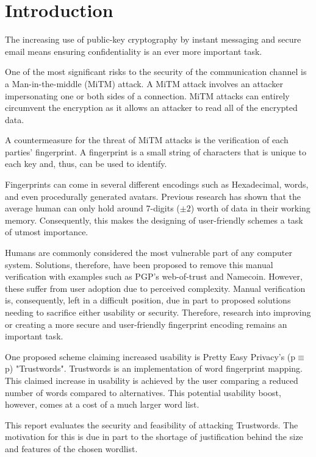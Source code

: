 \chapter{Introduction}
\label{cha:Introduction}

The increasing use of public-key cryptography by instant messaging and secure email means ensuring confidentiality is an ever more important task.

One of the most significant risks to the security of the communication channel is a Man-in-the-middle (MiTM) attack. A MiTM attack involves an attacker impersonating one or both sides of a connection. MiTM attacks can entirely circumvent the encryption as it allows an attacker to read all of the encrypted data. 

A countermeasure for the threat of MiTM attacks is the verification of each parties’ fingerprint. A fingerprint is a small string of characters that is unique to each key and, thus, can be used to identify.

Fingerprints can come in several different encodings such as Hexadecimal, words, and even procedurally generated avatars. Previous research has shown that the average human can only hold around 7-digits ($\pm 2$) worth of data in their working memory\cite{miller1956magical}. Consequently, this makes the designing of user-friendly schemes a task of utmost importance.

Humans are commonly considered the most vulnerable part of any computer system. Solutions, therefore, have been proposed to remove this manual verification with examples such as PGP's web-of-trust\cite{callas1998openpgp} and Namecoin\cite{kalodner2015empirical}. However, these suffer from user adoption due to perceived complexity. Manual verification is, consequently, left in a difficult position, due in part to proposed solutions needing to sacrifice either usability or security. Therefore, research into improving or creating a more secure and user-friendly fingerprint encoding remains an important task.

One proposed scheme claiming increased usability is Pretty Easy Privacy's (p$\equiv$p) "Trustwords". Trustwords is an implementation of word fingerprint mapping. This claimed increase in usability is achieved by the user comparing a reduced number of words compared to alternatives. This potential usability boost, however, comes at a cost of a much larger word list.

This report evaluates the security and feasibility of attacking Trustwords. The motivation for this is due in part to the shortage of justification behind the size and features of the chosen wordlist.

